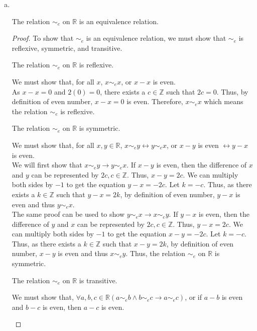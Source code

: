 \documentclass[11pt]{scrartcl}
\theoremstyle{dotlessP}
\theoremstyle{dotlessN}
\newcommand{\lra}{\leftrightarrow}
\newcommand{\reals}{\mathbb{R}} %
\newcommand{\ints}{\mathbb{Z}}
\begin{document}
\begin{enumerate}[(a)]
	\item \
		\begin{claim*}
			The relation $\sim_e$ on $\reals$ is an equivalence relation.
		\end{claim*}
		\begin{proof}
			To show that $\sim_e$ is an equivalence relation, we must show that $\sim_e$ is reflexive, symmetric, and transitive.
	\begin{claim*}
The relation $\sim_e$ on $\mathbb{R}$ is reflexive.
	\end{claim*}
	\begin{subproof}
		[Subproof]
		We must show that, for all $x$, $x \sim_e x$, or $x - x$ is even. 
		\\

		As $x - x = 0$ and $2(0) = 0$, there exists a $c \in \ints$ such that $2c = 0$. Thus, by definition of even number,  $x - x = 0$ is even. Therefore, $x \sim_e x$ which means the relation $\sim_e$ is reflexive.
	\end{subproof}
	\begin{claim*}
		The relation $\sim_e$ on $\reals$ is symmetric.
	\end{claim*}
	\begin{subproof}
		[Subproof]
		We must show that, for all $x,y \in \reals$, $x \sim_e y \lra y \sim_e x$, or $x - y$ is even $\lra y -x$ is even. 
		\\

		We will first show that $x \sim_e y \to y \sim_e x$.
		If $x-y$ is even, then the difference of $x$ and $y$ can be represented by  $2c, c \in \ints$. Thus,  $x - y = 2c$. We can multiply both sides by  $-1$ to get the equation $y - x = -2c$. Let $k = -c$. Thus, as there exists a $k \in \ints$ such that $y - x = 2k$, by definition of even number, $y - x$ is even and thus $y \sim_e x$.
		\\

		The same proof can be used to show $y \sim_e x \to x \sim_e y$. If $y - x$ is even, then the difference of $y$ and $x$ can be represented by $2c, c \in \ints$. Thus, $y-x = 2c$. We can multiply both sides by $-1$ to get the equation $x - y = -2c$. Let $k = -c$. Thus, as there exists a $k \in \ints$ such that $x - y = 2k$, by definition of even number, $x - y$ is even and thus $x \sim_e y$. Thus, the relation $\sim_e$ on $\reals$ is symmetric.
	\end{subproof}
	\begin{claim*}
		The relation $\sim_e$ on $\reals$ is transitive.
	\end{claim*}
	\begin{subproof}
		[Subproof]
		We must show that, $\forall a,b,c \in \reals (a \sim_e b \land b \sim_e c \to a \sim_e c)$, or if $a - b$ is even and $b - c$ is even, then $a - c$ is even.
		\\


\end{subproof}
\end{proof}
\end{enumerate}
\end{document}
